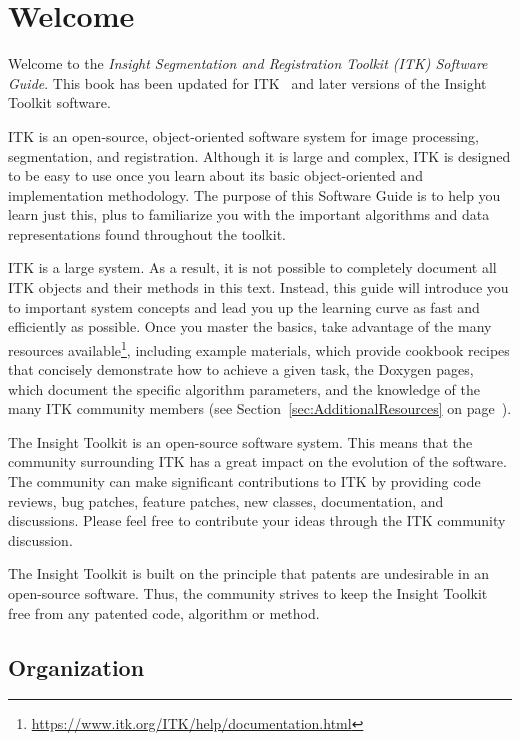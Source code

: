 \chapter{Welcome}%
\label{chapter:Introduction}

Welcome to the
\emph{Insight Segmentation and Registration Toolkit (ITK) Software Guide}. This
book has been updated for ITK \ITKVERSIONMAJORMINORPATCH\ and later versions of
the Insight Toolkit software.

ITK is an open-source, object-oriented software system for image processing,
segmentation, and registration. Although it is large and complex, ITK is
designed to be easy to use once you learn about its basic object-oriented and
implementation methodology. The purpose of this Software Guide is
to help you learn just this, plus to familiarize you with the important
algorithms and data representations found throughout the toolkit.

ITK is a large system. As a result, it is not possible to completely document
all ITK objects and their methods in this text. Instead, this guide will
introduce you to important system concepts and lead you up the learning curve
as fast and efficiently as possible. Once you master the basics, take
advantage of the many resources available\footnote{\url{https://www.itk.org/ITK/help/documentation.html}},
including example
materials, which provide cookbook recipes that concisely demonstrate how to
achieve a given task, the Doxygen pages, which document the specific algorithm
parameters, and the knowledge of the many ITK community members
(see Section~\ref{sec:AdditionalResources} on page~\pageref{sec:AdditionalResources}).

The Insight Toolkit is an open-source software system. This means that the
community surrounding ITK has a great impact on the evolution of the software.
The community can make significant contributions to ITK by providing code
reviews, bug patches, feature patches, new classes, documentation, and
discussions. Please feel free to contribute your ideas through the ITK
community discussion.

The Insight Toolkit is built on the principle that patents are undesirable in
an open-source software. Thus, the community strives to keep the Insight
Toolkit free from any patented code, algorithm or method.

\section{Organization}%
\label{sec:Organization}

